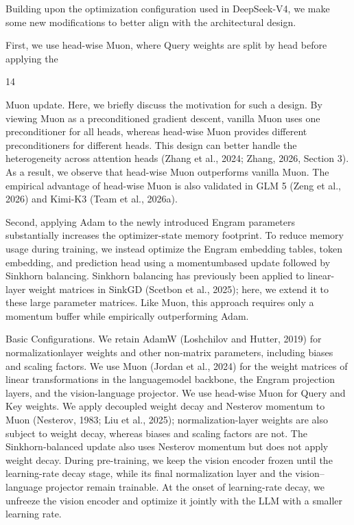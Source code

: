 \documentclass[
  10
]{article}
\begin{document}
Building upon the optimization configuration used in DeepSeek-V4, we
make some new modifications to better align with the architectural
design.

First, we use head-wise Muon, where Query weights are split by head
before applying the

14

Muon update. Here, we briefly discuss the motivation for such a design.
By viewing Muon as a preconditioned gradient descent, vanilla Muon uses
one preconditioner for all heads, whereas head-wise Muon provides
different preconditioners for different heads. This design can better
handle the heterogeneity across attention heads (Zhang et al., 2024;
Zhang, 2026, Section 3). As a result, we observe that head-wise Muon
outperforms vanilla Muon. The empirical advantage of head-wise Muon is
also validated in GLM 5 (Zeng et al., 2026) and Kimi-K3 (Team et al.,
2026a).

Second, applying Adam to the newly introduced Engram parameters
substantially increases the optimizer-state memory footprint. To reduce
memory usage during training, we instead optimize the Engram embedding
tables, token embedding, and prediction head using a momentumbased
update followed by Sinkhorn balancing. Sinkhorn balancing has previously
been applied to linear-layer weight matrices in SinkGD (Scetbon et al.,
2025); here, we extend it to these large parameter matrices. Like Muon,
this approach requires only a momentum buffer while empirically
outperforming Adam.

Basic Configurations. We retain AdamW (Loshchilov and Hutter, 2019) for
normalizationlayer weights and other non-matrix parameters, including
biases and scaling factors. We use Muon (Jordan et al., 2024) for the
weight matrices of linear transformations in the languagemodel backbone,
the Engram projection layers, and the vision-language projector. We use
head-wise Muon for Query and Key weights. We apply decoupled weight
decay and Nesterov momentum to Muon (Nesterov, 1983; Liu et al., 2025);
normalization-layer weights are also subject to weight decay, whereas
biases and scaling factors are not. The Sinkhorn-balanced update also
uses Nesterov momentum but does not apply weight decay. During
pre-training, we keep the vision encoder frozen until the learning-rate
decay stage, while its final normalization layer and the
vision--language projector remain trainable. At the onset of
learning-rate decay, we unfreeze the vision encoder and optimize it
jointly with the LLM with a smaller learning rate.
\end{document}
